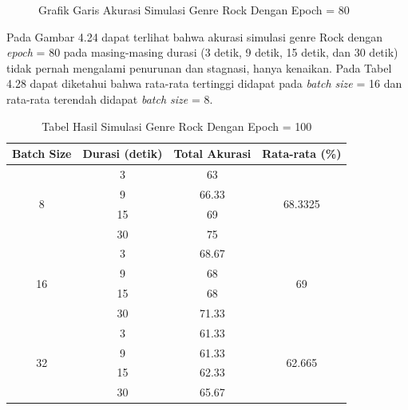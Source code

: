 \begin{enumerate}
\begin{figure}[H]
			\caption{Grafik Garis Akurasi Simulasi Genre Rock Dengan Epoch = 80}
			\label{fig:rocksumcharte80}
		\end{figure}
		
		Pada Gambar 4.24 dapat terlihat bahwa akurasi simulasi genre Rock dengan \emph{epoch} = 80 pada masing-masing durasi (3 detik, 9 detik, 15 detik, dan 30 detik) tidak pernah mengalami penurunan dan stagnasi, hanya kenaikan. Pada Tabel 4.28 dapat diketahui bahwa rata-rata tertinggi didapat pada \emph{batch size} = 16 dan rata-rata terendah didapat \emph{batch size} = 8.
		
		\begin{longtable}[c]{|c|c|c|c|}
			\caption{Tabel Hasil Simulasi Genre Rock Dengan Epoch = 100}
			\label{tab:my-table}\\
			\hline
			\textbf{Batch Size} & \textbf{Durasi (detik)} & \textbf{Total Akurasi} & \textbf{Rata-rata (\%)}       \\ \hline
			\endfirsthead
			\endhead
			\multirow{4}{*}{8}  & 3                       & 63                     & \multirow{4}{*}{68.3325} \\ \cline{2-3}
			& 9                       & 66.33                  &                          \\ \cline{2-3}
			& 15                      & 69                     &                          \\ \cline{2-3}
			& 30                      & 75                     &                          \\ \hline
			\multirow{4}{*}{16} & 3                       & 68.67                  & \multirow{4}{*}{69}      \\ \cline{2-3}
			& 9                       & 68                     &                          \\ \cline{2-3}
			& 15                      & 68                     &                          \\ \cline{2-3}
			& 30                      & 71.33                  &                          \\ \hline
			\multirow{4}{*}{32} & 3                       & 61.33                  & \multirow{4}{*}{62.665}  \\ \cline{2-3}
			& 9                       & 61.33                  &                          \\ \cline{2-3}
			& 15                      & 62.33                  &                          \\ \cline{2-3}
			& 30                      & 65.67                  &                          \\ \hline
		\end{longtable}
		

\end{enumerate}
